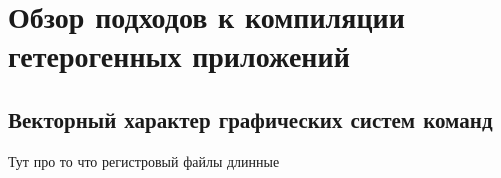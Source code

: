 \chapter{Обзор подходов к компиляции гетерогенных приложений}\label{ch:ch1}

\section{Векторный характер графических систем команд}\label{sec:ch1/sec1}

Тут про то что регистровый файлы длинные

\FloatBarrier
